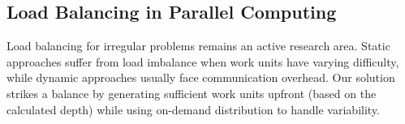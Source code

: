 \subsection{Load Balancing in Parallel Computing}
\label{subsec:load_balancing_in_parallel_computing}
Load balancing for irregular problems remains an active research area. Static approaches suffer from load imbalance when work units have varying difficulty, while dynamic approaches usually face communication overhead. Our solution strikes a balance by generating sufficient work units upfront (based on the calculated depth) while using on-demand distribution to handle variability.
